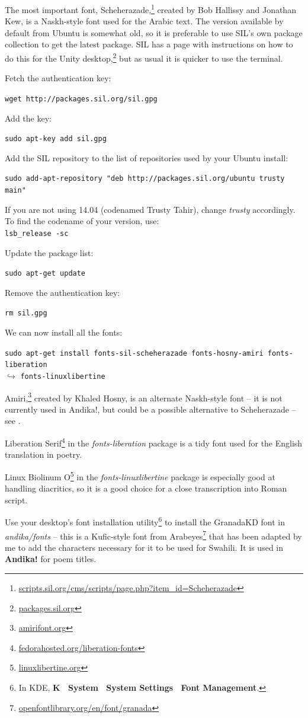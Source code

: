 The most important font, Scheherazade,\footnote{\url{scripts.sil.org/cms/scripts/page.php?item_id=Scheherazade}} created by Bob Hallissy and Jonathan Kew, is a Naskh-style font used for the Arabic text.  The version available by default from Ubuntu is somewhat old, so it is preferable to use SIL's own package collection to get the latest package.  SIL has a page with instructions on how to do this for the Unity desktop,\footnote{\url{packages.sil.org}} but as usual it is quicker to use the terminal.

Fetch the authentication key:

\verb|wget http://packages.sil.org/sil.gpg|

Add the key:

\verb|sudo apt-key add sil.gpg|

Add the SIL repository to the list of repositories used by your Ubuntu install:

\verb|sudo add-apt-repository "deb http://packages.sil.org/ubuntu trusty main"|

If you are not using 14.04 (codenamed Trusty Tahir), change \textit{trusty} accordingly.  To find the codename of your version, use:\\
\verb|lsb_release -sc|

Update the package list:

\verb|sudo apt-get update|

Remove the authentication key:

\verb|rm sil.gpg|

We can now install all the fonts:

\verb|sudo apt-get install fonts-sil-scheherazade fonts-hosny-amiri fonts-liberation|\\
$\hookrightarrow$ \verb|fonts-linuxlibertine|

Amiri,\footnote{\url{amirifont.org}} created by Khaled Hosny, is an alternate Naskh-style font -- it is not currently used in Andika!, but could be a possible alternative to Scheherazade -- see .

Liberation Serif\footnote{\url{fedorahosted.org/liberation-fonts}} in the \textit{fonts-liberation} package is a tidy font used for the English translation in poetry.

Linux Biolinum O\footnote{\url{linuxlibertine.org}} in the \textit{fonts-linuxlibertine} package is especially good at handling diacritics, so it is a good choice for a close transcription into Roman script.

Use your desktop's font installation utility\footnote{In KDE, \textbf{K \textrightarrow\ System \textrightarrow\ System Settings \textrightarrow\ Font Management}.} to install the GranadaKD font in \textit{andika/fonts} -- this is a Kufic-style font from Arabeyes\footnote{\url{openfontlibrary.org/en/font/granada}} that has been adapted by me to add the characters necessary for it to be used for Swahili.  It is used in \textbf{Andika!} for poem titles.

